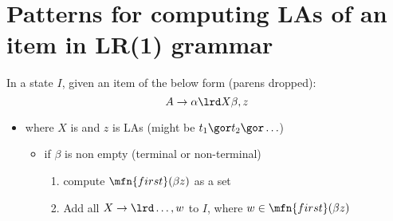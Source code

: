 \section*{Patterns for computing LAs of an item in LR(1) grammar}
In a state $I$, given an item of the below form (parens dropped):
  \[
    A\to \alpha\lrd X\beta, z
  \]
\begin{itemize}
\item where $X$ is  and $z$ is LAs (might be $t_1\gor t_2\gor\ldots$)
  \begin{itemize}[leftmargin=3em]
  \item if $\beta$ is non empty (terminal or non-terminal)
    \begin{enumerate}
    \item compute $\mfn{first}(\beta z)$ as a set
    \item Add all $X\to\lrd \ldots, w$ to $I$, where $w \in \mfn{first}(\beta z)$


\end{enumerate}
\end{itemize}
\end{itemize}
